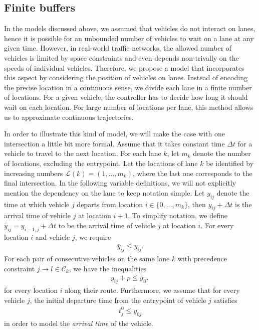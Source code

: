 \documentclass{article}
\theoremstyle{definition}
\theoremstyle{plain}
\begin{document}
\subsection{Finite buffers}


In the models discussed above, we assumed that vehicles do not interact on
lanes, hence it is possible for an unbounded number of vehicles to wait on a
lane at any given time. However, in real-world traffic networks, the allowed
number of vehicles is limited by space constraints and even depends non-trivally
on the speeds of individual vehicles. Therefore, we propose a model that
incorporates this aspect by considering the position of vehicles on lanes.
Instead of encoding the precise location in a continuous sense, we divide each
lane in a finite number of locations. For a given vehicle, the controller has to
decide how long it should wait on each location. For large number of locations
per lane, this method allows us to approximate continuous trajectories.


In order to illustrate this kind of model, we will make the case with one
intersection a little bit more formal. Assume that it takes constant time
$\Delta t$ for a vehicle to travel to the next location. For each lane $k$, let
$m_{k}$ denote the number of locations, excluding the entrypoint. Let the
locations of lane $k$ be identified by increasing numbers
$\mathcal{L}(k) = (1, \dots , m_{k})$, where the last one corresponds to the
final intersection. In the following variable definitions, we will not
explicitly mention the dependency on the lane to keep notation simple. Let
$y_{ij}$ denote the time at which vehicle $j$ departs from location
$i \in \{ 0, \dots, m_{k} \}$, then $y_{ij} + \Delta t$ is the arrival time of
vehicle $j$ at location $i+1$. To simplify notation, we define
$\bar{y}_{ij} = y_{i-1,j} + \Delta t$ to be the arrival time of vehicle $j$ at
location $i$. For every location $i$ and vehicle $j$, we require
\begin{align}
  \label{eq:constr1}
  \bar{y}_{ij} \leq y_{ij} .
\end{align}
For each pair of consecutive vehicles on the same lane $k$ with precedence
constraint $j \rightarrow l \in \mathcal{C}_{k}$, we have the inequalities
\begin{align}
  \label{eq:constr2}
  y_{ij} + p \leq \bar{y}_{il} ,
\end{align}
for every location $i$ along their route. Furthermore, we assume that for every
vehicle $j$, the initial departure time from the entrypoint of vehicle $j$ satisfies
\begin{align}
  \label{eq:release}
 t^{0}_{j} \leq y_{0j}
\end{align}
in order to model the \textit{arrival time} of the vehicle.
\end{document}
